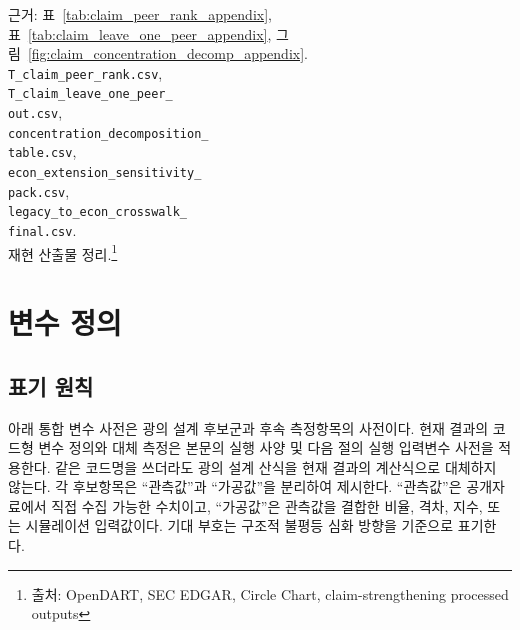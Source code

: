 \documentclass[11pt,a4paper]{report}
\newcommand{\sourcefootnote}[1]{\footnote{출처: #1}}
\begin{document}
\noindent\begin{minipage}{0.93\textwidth}
\small
근거: 표~\ref{tab:claim_peer_rank_appendix}, 표~\ref{tab:claim_leave_one_peer_appendix}, 그림~\ref{fig:claim_concentration_decomp_appendix}.\\
\texttt{T\_claim\_peer\_rank.csv},\\
\texttt{T\_claim\_leave\_one\_peer\_}\\\texttt{out.csv},\\
\texttt{concentration\_decomposition\_}\\\texttt{table.csv},\\
\texttt{econ\_extension\_sensitivity\_}\\\texttt{pack.csv},\\
\texttt{legacy\_to\_econ\_crosswalk\_}\\\texttt{final.csv}.\\
재현 산출물 정리.\sourcefootnote{OpenDART, SEC EDGAR, Circle Chart, claim-strengthening processed outputs}
\end{minipage}

\section{변수 정의}
\subsection{표기 원칙}
아래 통합 변수 사전은 광의 설계 후보군과 후속 측정항목의 사전이다. 현재 결과의 코드형 변수 정의와 대체 측정은 본문의 실행 사양 및 다음 절의 실행 입력변수 사전을 적용한다. 같은 코드명을 쓰더라도 광의 설계 산식을 현재 결과의 계산식으로 대체하지 않는다. 각 후보항목은 ``관측값''과 ``가공값''을 분리하여 제시한다. ``관측값''은 공개자료에서 직접 수집 가능한 수치이고, ``가공값''은 관측값을 결합한 비율, 격차, 지수, 또는 시뮬레이션 입력값이다. 기대 부호는 구조적 불평등 심화 방향을 기준으로 표기한다.
\end{document}
